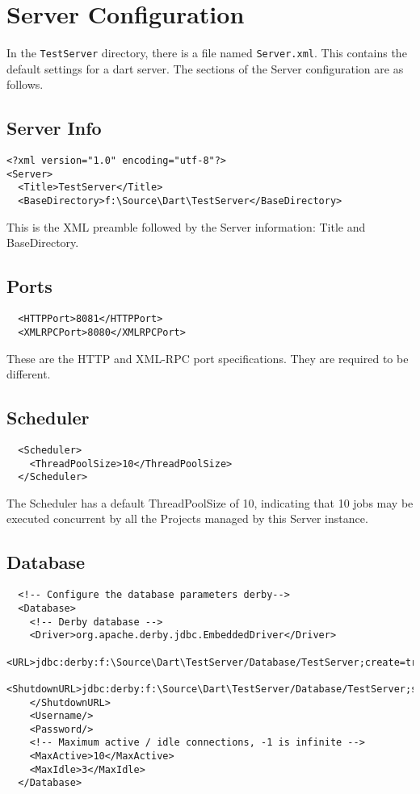 \documentclass{InsightBook}
\newcommand{\filename}[1]{\texttt{#1}}
\begin{document}
\section{Server Configuration}
\label{Section:Settings}
In the \texttt{TestServer} directory, there is a file named
\filename{Server.xml}.  This contains the default settings for a dart
server.  The sections of the Server configuration are as follows.

\subsection{Server Info}
\begin{verbatim}
<?xml version="1.0" encoding="utf-8"?>
<Server>
  <Title>TestServer</Title>
  <BaseDirectory>f:\Source\Dart\TestServer</BaseDirectory>
\end{verbatim}

This is the XML preamble followed by the Server information: Title and
BaseDirectory.

\subsection{Ports}
\begin{verbatim}
  <HTTPPort>8081</HTTPPort>
  <XMLRPCPort>8080</XMLRPCPort>
\end{verbatim}
These are the HTTP and XML-RPC port specifications.  They are required
to be different.

\subsection{Scheduler}
\begin{verbatim}
  <Scheduler>
    <ThreadPoolSize>10</ThreadPoolSize>
  </Scheduler>
\end{verbatim}

The Scheduler has a default ThreadPoolSize of 10, indicating that 10
 jobs may be executed concurrent by all the Projects managed by this
 Server instance.

\subsection{Database}
\begin{verbatim}
  <!-- Configure the database parameters derby-->
  <Database>
    <!-- Derby database -->
    <Driver>org.apache.derby.jdbc.EmbeddedDriver</Driver>
    <URL>jdbc:derby:f:\Source\Dart\TestServer/Database/TestServer;create=true</URL>
    <ShutdownURL>jdbc:derby:f:\Source\Dart\TestServer/Database/TestServer;shutdown=true
    </ShutdownURL>
    <Username/>
    <Password/>
    <!-- Maximum active / idle connections, -1 is infinite -->
    <MaxActive>10</MaxActive>
    <MaxIdle>3</MaxIdle>
  </Database>
\end{verbatim}
\end{document}
